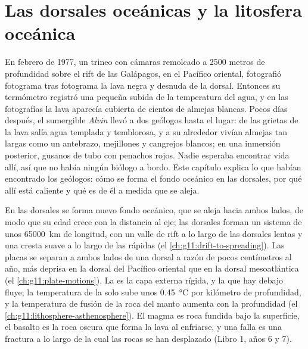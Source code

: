 \chapter{Las dorsales oceánicas y la litosfera oceánica}\label{ch:g11:ocean-ridges}

En febrero de 1977, un trineo con cámaras remolcado a 2500 metros de
profundidad sobre el rift de las Galápagos, en el Pacífico oriental,
fotografió fotograma tras fotograma la lava negra y desnuda de la dorsal.
Entonces su termómetro registró una pequeña subida de la temperatura del agua,
y en las fotografías la lava aparecía cubierta de cientos de almejas blancas.
Pocos días después, el sumergible \emph{Alvin} llevó a dos geólogos hasta el
lugar: de las grietas de la lava salía agua templada y temblorosa, y a su
alrededor vivían almejas tan largas como un antebrazo, mejillones y cangrejos
blancos; en una inmersión posterior, gusanos de tubo con penachos rojos. Nadie
esperaba encontrar vida allí, así que no había ningún biólogo a bordo. Este
capítulo explica lo que habían encontrado los geólogos: cómo se forma el fondo
oceánico en las dorsales, por qué allí está caliente y qué es de él a medida
que se aleja.

\begin{recall}
En las dorsales se forma nuevo fondo oceánico, que se aleja hacia ambos lados,
de modo que su edad crece con la distancia al eje; las dorsales forman un
sistema de unos \qty{65000}{km} de longitud, con un valle de rift a lo largo
de las dorsales lentas y una cresta suave a lo largo de las rápidas (el
\cref{ch:g11:drift-to-spreading}). Las placas se separan a ambos lados de una
dorsal a razón de pocos centímetros al año, más deprisa en la dorsal del
Pacífico oriental que en la dorsal mesoatlántica (el \cref{ch:g11:plate-motions}).
La  es la capa externa rígida, y la  que hay debajo fluye;
la temperatura de la  solo sube unos \qty{0.45}{\celsius} por
kilómetro de profundidad, y la temperatura de fusión de la roca del manto
aumenta con la profundidad (el \cref{ch:g11:lithosphere-asthenosphere}). El
magma es roca fundida bajo la superficie, el basalto es la roca oscura que
forma la lava al enfriarse, y una falla es una fractura a lo largo de la cual
las rocas se han desplazado (Libro 1, años 6 y 7).
\end{recall}

